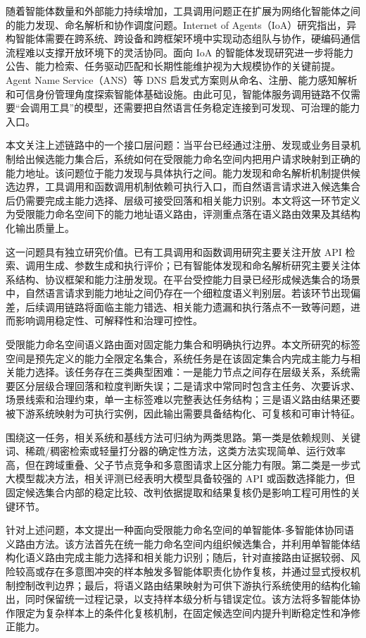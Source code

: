 \documentclass[10pt,a4paper,twocolumn,fontset=fandol]{ctexart}
\begin{document}
随着智能体数量和外部能力持续增加，工具调用问题正在扩展为网络化智能体之间的能力发现、命名解析和协作调度问题。Internet of Agents（IoA）研究指出，异构智能体需要在跨系统、跨设备和跨框架环境中实现动态组队与协作，硬编码通信流程难以支撑开放环境下的灵活协同\cite{ioa}。面向 IoA 的智能体发现研究进一步将能力公告、能力检索、任务驱动匹配和长期性能维护视为大规模协作的关键前提\cite{agentdiscovery}。Agent Name Service（ANS）等 DNS 启发式方案则从命名、注册、能力感知解析和可信身份管理角度探索智能体基础设施\cite{ans}。由此可见，智能体服务调用链路不仅需要“会调用工具”的模型，还需要把自然语言任务稳定连接到可发现、可治理的能力入口。

本文关注上述链路中的一个接口层问题：当平台已经通过注册、发现或业务目录机制给出候选能力集合后，系统如何在受限能力命名空间内把用户请求映射到正确的能力地址。该问题位于能力发现与具体执行之间。能力发现和命名解析机制提供候选边界，工具调用和函数调用机制依赖可执行入口，而自然语言请求进入候选集合后仍需要完成主能力选择、层级可接受回落和相关能力识别。本文将这一环节定义为受限能力命名空间下的能力地址语义路由，评测重点落在语义路由效果及其结构化输出质量上。

这一问题具有独立研究价值。已有工具调用和函数调用研究主要关注开放 API 检索、调用生成、参数生成和执行评价\cite{gorilla,toollm,apibank,bfcl}；已有智能体发现和命名解析研究主要关注体系结构、协议框架和能力注册发现\cite{agentdiscovery,ans}。在平台受控能力目录已经形成候选集合的场景中，自然语言请求到能力地址之间仍存在一个细粒度语义判别层。若该环节出现偏差，后续调用链路将面临主能力错选、相关能力遗漏和执行落点不一致等问题，进而影响调用稳定性、可解释性和治理可控性。

受限能力命名空间语义路由面对固定能力集合和明确执行边界。本文所研究的标签空间是预先定义的能力全限定名集合，系统任务是在该固定集合内完成主能力与相关能力选择。该任务存在三类典型困难：一是能力节点之间存在层级关系，系统需要区分层级合理回落和粒度判断失误；二是请求中常同时包含主任务、次要诉求、场景线索和治理约束，单一主标签难以完整表达任务结构；三是语义路由结果还要被下游系统映射为可执行实例，因此输出需要具备结构化、可复核和可审计特征。

围绕这一任务，相关系统和基线方法可归纳为两类思路。第一类是依赖规则、关键词、稀疏/稠密检索或轻量打分器的确定性方法\cite{dpr,routellm}，这类方法实现简单、运行效率高，但在跨域重叠、父子节点竞争和多意图请求上区分能力有限。第二类是一步式大模型裁决方法，相关评测已经表明大模型具备较强的 API 或函数选择能力\cite{gorilla,apibank,bfcl}，但固定候选集合内部的稳定比较、改判依据提取和结果复核仍是影响工程可用性的关键环节。

针对上述问题，本文提出一种面向受限能力命名空间的单智能体-多智能体协同语义路由方法。该方法首先在统一能力命名空间内组织候选集合，并利用单智能体结构化语义路由完成主能力选择和相关能力识别；随后，针对直接路由证据较弱、风险较高或存在多意图冲突的样本触发多智能体职责化协作复核，并通过显式授权机制控制改判边界；最后，将语义路由结果映射为可供下游执行系统使用的结构化输出，同时保留统一过程记录，以支持样本级分析与错误定位。该方法将多智能体协作限定为复杂样本上的条件化复核机制，在固定候选空间内提升判断稳定性和净修正能力。
\end{document}
